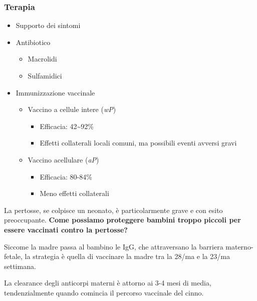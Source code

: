 \documentclass[italian,]{article}
\providecommand{\tightlist}{%
  \setlength{\itemsep}{0pt}\setlength{\parskip}{0pt}}
\newcommand{\normalbox}[2]{\begin{tcolorbox}[title=#1]#2\end{tcolorbox}} %
\begin{document}
\hypertarget{terapia-4}{%
\subsubsection{Terapia}\label{terapia-4}}

\begin{itemize}
\tightlist
\item
  Supporto dei sintomi
\item
  Antibiotico

  \begin{itemize}
  \tightlist
  \item
    Macrolidi
  \item
    Sulfamidici
  \end{itemize}
\item
  Immunizzazione vaccinale

  \begin{itemize}
  \tightlist
  \item
    Vaccino a cellule intere (\emph{wP})

    \begin{itemize}
    \tightlist
    \item
      Efficacia: 42\textasciitilde{}92\%
    \item
      Effetti collaterali locali comuni, ma possibili eventi avversi
      gravi
    \end{itemize}
  \item
    Vaccino acellulare (\emph{aP})

    \begin{itemize}
    \tightlist
    \item
      Efficacia: 80-84\%
    \item
      Meno effetti collaterali
    \end{itemize}
  \end{itemize}
\end{itemize}

\normalbox{Pertosse e donna in gravidanza}{
La pertosse, se colpisce un neonato, è particolarmente grave e con esito preoccupante. \textbf{Come possiamo proteggere bambini troppo piccoli per essere vaccinati contro la pertosse?}

Siccome la madre passa al bambino le IgG, che attraversano la barriera materno-fetale, la strategia è quella di vaccinare la madre tra la 28/ma e la 23/ma settimana.

La clearance degli anticorpi materni è attorno ai 3-4 mesi di media, tendenzialmente quando comincia il percorso vaccinale del cinno.
}
\end{document}
